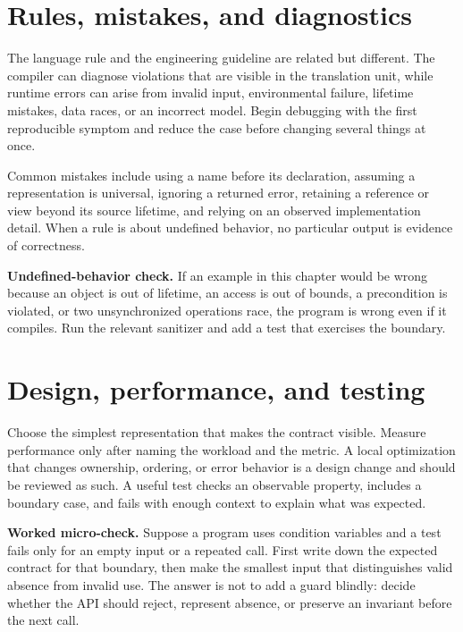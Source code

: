 \section{Rules, mistakes, and diagnostics}
The language rule and the engineering guideline are related but different. The compiler can diagnose violations that are visible in the translation unit, while runtime errors can arise from invalid input, environmental failure, lifetime mistakes, data races, or an incorrect model. Begin debugging with the first reproducible symptom and reduce the case before changing several things at once.

Common mistakes include using a name before its declaration, assuming a representation is universal, ignoring a returned error, retaining a reference or view beyond its source lifetime, and relying on an observed implementation detail. When a rule is about undefined behavior, no particular output is evidence of correctness.

\begin{warning}
\textbf{Undefined-behavior check.} If an example in this chapter would be wrong because an object is out of lifetime, an access is out of bounds, a precondition is violated, or two unsynchronized operations race, the program is wrong even if it compiles. Run the relevant sanitizer and add a test that exercises the boundary.
\end{warning}

\section{Design, performance, and testing}
Choose the simplest representation that makes the contract visible. Measure performance only after naming the workload and the metric. A local optimization that changes ownership, ordering, or error behavior is a design change and should be reviewed as such. A useful test checks an observable property, includes a boundary case, and fails with enough context to explain what was expected.

\begin{worked}
\textbf{Worked micro-check.} Suppose a program uses condition variables and a test fails only for an empty input or a repeated call. First write down the expected contract for that boundary, then make the smallest input that distinguishes valid absence from invalid use. The answer is not to add a guard blindly: decide whether the API should reject, represent absence, or preserve an invariant before the next call.
\end{worked}

